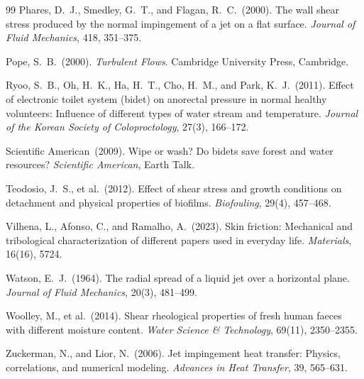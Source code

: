 \documentclass[aps,prfluids,reprint,amsmath,amssymb,floatfix]{revtex4-2}
\begin{document}
\begin{thebibliography}{99}
Phares, D.~J., Smedley, G.~T., and Flagan, R.~C.\ (2000).
The wall shear stress produced by the normal impingement of a jet on a flat
surface.
\textit{Journal of Fluid Mechanics}, 418, 351--375.

Pope, S.~B.\ (2000).
\textit{Turbulent Flows}.
Cambridge University Press, Cambridge.

Ryoo, S.~B., Oh, H.~K., Ha, H.~T., Cho, H.~M., and Park, K.~J.\ (2011).
Effect of electronic toilet system (bidet) on anorectal pressure in normal
healthy volunteers: Influence of different types of water stream and
temperature.
\textit{Journal of the Korean Society of Coloproctology}, 27(3), 166--172.

Scientific American\ (2009).
Wipe or wash? Do bidets save forest and water resources?
\textit{Scientific American}, Earth Talk.

Teodosio, J.~S., et al.\ (2012).
Effect of shear stress and growth conditions on detachment and physical
properties of biofilms.
\textit{Biofouling}, 29(4), 457--468.

Vilhena, L., Afonso, C., and Ramalho, A.\ (2023).
Skin friction: Mechanical and tribological characterization of different
papers used in everyday life.
\textit{Materials}, 16(16), 5724.

Watson, E.~J.\ (1964).
The radial spread of a liquid jet over a horizontal plane.
\textit{Journal of Fluid Mechanics}, 20(3), 481--499.

Woolley, M., et al.\ (2014).
Shear rheological properties of fresh human faeces with different moisture
content.
\textit{Water Science \& Technology}, 69(11), 2350--2355.

Zuckerman, N., and Lior, N.\ (2006).
Jet impingement heat transfer: Physics, correlations, and numerical
modeling.
\textit{Advances in Heat Transfer}, 39, 565--631.

\end{thebibliography}
\end{document}
